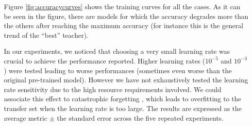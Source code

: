\documentclass{elsarticle}
\begin{document}
Figure \ref{fig:accuracycurves}  shows the training curves for all the cases. As it can be seen in the figure, there are models for which the accuracy degrades more than the others after reaching the maximum accuracy (for instance this is the general trend of the ``best'' teacher). 

In our experiments, we noticed that choosing a very small learning rate was crucial to achieve the performance reported. Higher learning rates ($10^{-5}$ and  $10^{-3}$) were tested leading to worse performances (sometimes even worse than the original pre-trained model). However we have not exhaustively tested the learning rate sensitivity due to the high resource requirements involved. We could associate this effect to catastrophic forgetting \citep{French99}, which leads to overfitting to the transfer set when the learning rate is too large. The results are expressed as the average metric $\pm$ the standard error across the five repeated experiments.
\end{document}
